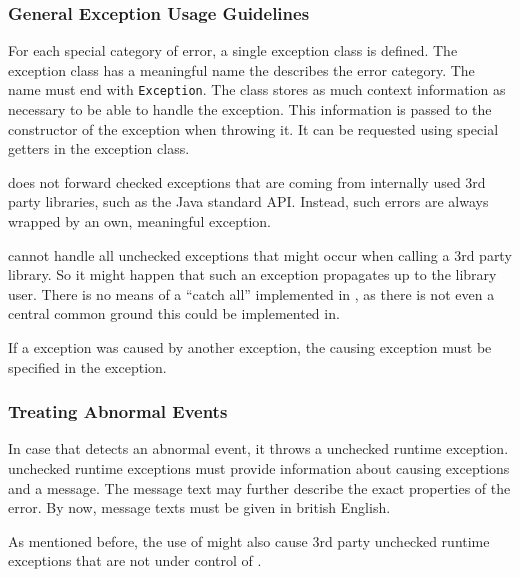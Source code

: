 \subsubsection{General Exception Usage Guidelines}
\label{sec:GeneralExceptionUsageGuidelines}

For each special category of error, a single exception class is defined. The exception class has a meaningful name the describes the error category. The name must end with \texttt{Exception}. The class stores as much context information as necessary to be able to handle the exception. This information is passed to the constructor of the exception when throwing it. It can be requested using special getters in the exception class.

\LibName{} does not forward checked exceptions that are coming from internally used 3rd party libraries, such as the Java standard API. Instead, such errors are always wrapped by an own, meaningful \LibName{} exception.

\LibName{} cannot handle all unchecked exceptions that might occur when calling a 3rd party library. So it might happen that such an exception propagates up to the \LibName{} library user. There is no means of a "`catch all"' implemented in \LibName{}, as there is not even a central common ground this could be implemented in.

If a \LibName{} exception was caused by another exception, the causing exception must be specified in the \LibName{} exception.


\subsubsection{Treating Abnormal Events}
\label{sec:HandlingAbnormalEvents}

In case that \LibName{} detects an abnormal event, it throws a \LibName{} unchecked runtime exception. \LibName{} unchecked runtime exceptions must provide information about causing exceptions and a message. The message text may further describe the exact properties of the error. By now, message texts must be given in british English.

As mentioned before, the use of \LibName{} might also cause 3rd party unchecked runtime exceptions that are not under control of \LibName{}.

